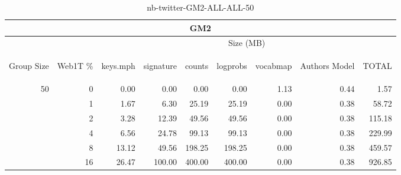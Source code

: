 \begin{center}
\begin{table}[htbp]
\begin{tabular}{ | r | r | r | r | r | r | r | r | r |}
\hline
\multicolumn{9}{|c|}{GM2}\\
\hline
 & & \multicolumn{7}{|c|}{Size (MB)}\\ \cline{3-9}
\begin{sideways}Group Size\end{sideways} & \begin{sideways}Web1T \% \end{sideways} & \begin{sideways}keys.mph\end{sideways} & \begin{sideways}signature\end{sideways} & \begin{sideways}counts\end{sideways} & \begin{sideways}logprobs\end{sideways} & \begin{sideways}vocabmap\end{sideways} & \begin{sideways}Authors Model \end{sideways} & \begin{sideways}TOTAL\end{sideways}\\
\hline
\multirow{5}{*}{50}
 & 0 & 0.00 & 0.00 & 0.00 & 0.00 & 1.13 & 0.44 & 1.57\\ \cline{2-9}
 & 1 & 1.67 & 6.30 & 25.19 & 25.19 & 0.00 & 0.38 & 58.72\\ \cline{2-9}
 & 2 & 3.28 & 12.39 & 49.56 & 49.56 & 0.00 & 0.38 & 115.18\\ \cline{2-9}
 & 4 & 6.56 & 24.78 & 99.13 & 99.13 & 0.00 & 0.38 & 229.99\\ \cline{2-9}
 & 8 & 13.12 & 49.56 & 198.25 & 198.25 & 0.00 & 0.38 & 459.57\\ \cline{2-9}
 & 16 & 26.47 & 100.00 & 400.00 & 400.00 & 0.00 & 0.38 & 926.85\\ \cline{2-9}
\hline
\end{tabular}
\caption{nb-twitter-GM2-ALL-ALL-50}
\label{table:nb-twitter-GM2-ALL-ALL-50}
\end{table}
\end{center}

